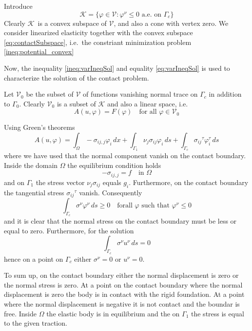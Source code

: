 \documentclass[12pt,a4paper]{article}
\numberwithin{equation}{section}
\numberwithin{table}{section}
\numberwithin{figure}{section}
\newcommand{\V}{\ensuremath{\mathcal{V}}}
\newcommand{\K}{\ensuremath{\mathcal{K}}}
\newcommand{\intO}{\int_\Omega\!\!}
\newcommand{\intG}[1][0]{\int_{\Gamma_{#1}}\!\!}
\renewcommand{\phi}{\varphi}
\newcommand{\stress}[1][]{\ensuremath{\sigma_{#1}}}
\newcommand{\sigij}{\stress[ij]}
\newcommand{\djstress}[1][]{\ensuremath{\sigma_{#1,j}}}
\newcommand{\djsigij}{\djstress[ij]}
\newcommand{\dx}{{\,dx}}
\newcommand{\ds}{{\,ds}}
\begin{document}
Introduce
\begin{equation}
  \label{eq:contactSubspace}
  \K = \{ \phi\in \V \colon \phi^\nu \le 0 \text{ a.e.\ on $\Gamma_c$}\}
\end{equation}
Clearly \K\ is a convex subspace of $\V$, and also a cone with vertex zero.
We consider linearized elasticity together with the convex subspace \eqref{eq:contactSubspace}, i.e.\ the constriant minimization problem \eqref{ineq:potential_convex}

Now, the inequality \eqref{ineq:varIneqSol} and equality \eqref{eq:varIneqSol} is used to characterize the solution of the contact problem.

Let $\V_0$ be the subset of $\V$ of functions vanishing normal trace on $\Gamma_c$ in addition to $\Gamma_0$. Clearly $\V_0$ is a subset of $\K$ and also a linear space, i.e.\
\begin{equation}
  A(u,\phi) = F(\phi) \quad\text{for all $\phi\in\V_0$}
\end{equation}

Using Green's theorems
\begin{equation}
  A(u,\phi) = \intO -\djsigij \phi_i \dx
  + \intG[1] \nu_j \sigij \phi_i \ds + \intG[c] \sigij^\tau \phi^\tau_i \ds
\end{equation}
where we have used that the normal component vanish on the contact boundary. Inside the domain $\Omega$ the equilibrium condition holds
\begin{equation}
  -\djsigij = f \quad\text{in $\Omega$}
\end{equation}
and on $\Gamma_1$ the stress vector $\nu_j \sigij$ equals $g_i$. Furthermore, on the contact boundary the tangential stress $\sigij^\tau$ vanish.  Consequently
\begin{equation}
  \intG[c] \sigma^\nu \phi^\nu \ds \ge 0 \quad\text{forall $\phi$ such that $\phi^\nu \le 0$}
\end{equation}
and it is clear that the normal stress on the contact boundary must be less or equal to zero. Furthermore, for the solution
\begin{equation}
  \intG[c] \sigma^\nu u^\nu \ds = 0
\end{equation}
hence on a point on $\Gamma_c$ either $\sigma^\nu = 0$ or $u^\nu = 0$.

To sum up, on the contact boundary either the normal displacement is zero or the normal stress is zero. At a point on the contact boundary where the normal displacement is zero the body is in contact with the rigid foundation. At a point where the normal displacement is negative it is not contact and the boundar is free.  Inside $\Omega$ the elastic body is in equilibrium and the on $\Gamma_1$ the stress is equal to the given traction.
\end{document}
